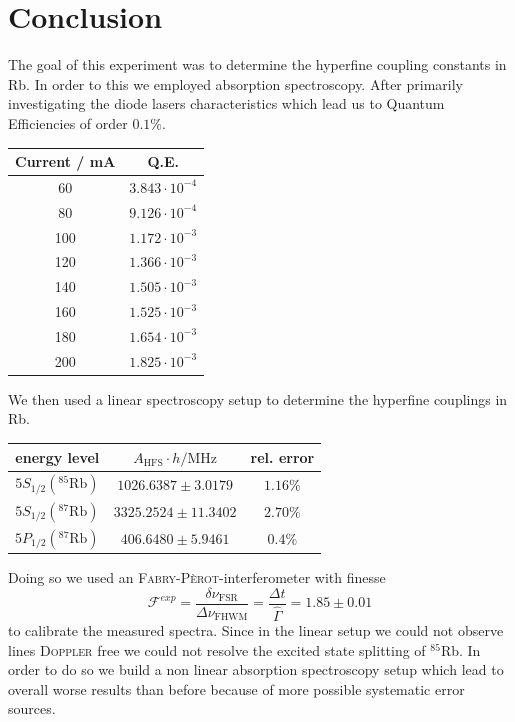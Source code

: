 \documentclass[11pt,a4paper,notitlepage]{scrartcl}
\begin{document}
\section{Conclusion}
The goal of this experiment was to determine the hyperfine coupling constants in Rb. In order to this we employed absorption spectroscopy. After primarily investigating the diode lasers characteristics which lead us to Quantum Efficiencies of order $0.1\%$.
\begin{center}
			\begin{tabular}{cc}
		\toprule
		Current / mA & Q.E.      \\
		\hline
		60           & $3.843\cdot 10^{-4}$ \\
		80           & $9.126\cdot 10^{-4}$ \\
		100          & $1.172\cdot 10^{-3}$ \\
		120          & $1.366\cdot 10^{-3}$ \\
		140          & $1.505\cdot 10^{-3}$ \\
		160          & $1.525\cdot 10^{-3}$ \\
		180          & $1.654\cdot 10^{-3}$ \\
		200          & $1.825\cdot 10^{-3}$\\
		\bottomrule
	\end{tabular}
\end{center}
We then used a linear spectroscopy setup to determine the hyperfine couplings in Rb.
\begin{center}
	 	\begin{tabular}{c|c|c}
		\toprule
		energy level & $A_\text{HFS} \cdot h / \si{\mega \Hz} $ & rel. error \\
		\hline
		$5S_{1/2}(^{85}\text{Rb})$& $ 1026.6387\pm3.0179$& $1.16\%$\\
		$5S_{1/2}(^{87}\text{Rb})$& $ 3325.2524\pm11.3402$& $2.70\%$\\
		$5P_{1/2}(^{87}\text{Rb})$& $ 406.6480\pm5.9461$& $0.4\%$\\
		\bottomrule
	\end{tabular}
\end{center}
Doing so we used an \textsc{Fabry-Pèrot}-interferometer with finesse $$\mathcal{F}^{exp}=\frac{\delta\nu_{\text{FSR}}}{\Delta\nu_\text{FHWM}}=\frac{\Delta t}{\hat{\Gamma}}=1.85\pm0.01$$ to calibrate the measured spectra.
Since in the linear setup we could not observe lines \textsc{Doppler} free we could not resolve the excited state splitting of $^{85}$Rb. In order to do so we build a non linear absorption spectroscopy setup which lead to overall worse results than before because of more possible systematic error sources.
\end{document}
